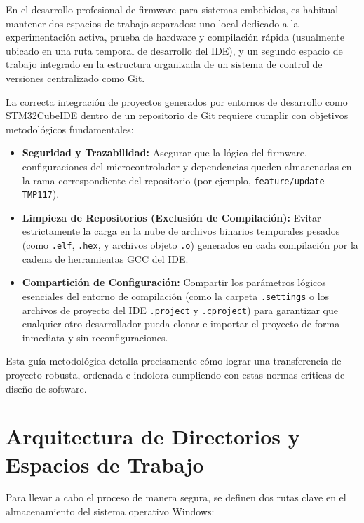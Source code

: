 \documentclass[
10pt, %
a4paper, %
oneside, %
headinclude,footinclude, %
BCOR5mm, %
]{scrartcl}
\begin{document}
En el desarrollo profesional de firmware para sistemas embebidos, es habitual mantener dos espacios de trabajo separados: uno local dedicado a la experimentación activa, prueba de hardware y compilación rápida (usualmente ubicado en una ruta temporal de desarrollo del IDE), y un segundo espacio de trabajo integrado en la estructura organizada de un sistema de control de versiones centralizado como Git.

La correcta integración de proyectos generados por entornos de desarrollo como STM32CubeIDE dentro de un repositorio de Git requiere cumplir con objetivos metodológicos fundamentales:

\begin{itemize}
	\item \textbf{Seguridad y Trazabilidad:} Asegurar que la lógica del firmware, configuraciones del microcontrolador y dependencias queden almacenadas en la rama correspondiente del repositorio (por ejemplo, \texttt{feature/update-TMP117}).
	\item \textbf{Limpieza de Repositorios (Exclusión de Compilación):} Evitar estrictamente la carga en la nube de archivos binarios temporales pesados (como \texttt{.elf}, \texttt{.hex}, y archivos objeto \texttt{.o}) generados en cada compilación por la cadena de herramientas GCC del IDE.
	\item \textbf{Compartición de Configuración:} Compartir los parámetros lógicos esenciales del entorno de compilación (como la carpeta \texttt{.settings} o los archivos de proyecto del IDE \texttt{.project} y \texttt{.cproject}) para garantizar que cualquier otro desarrollador pueda clonar e importar el proyecto de forma inmediata y sin reconfiguraciones.
\end{itemize}

Esta guía metodológica detalla precisamente cómo lograr una transferencia de proyecto robusta, ordenada e indolora cumpliendo con estas normas críticas de diseño de software.

\newpage
\section{Arquitectura de Directorios y Espacios de Trabajo}

Para llevar a cabo el proceso de manera segura, se definen dos rutas clave en el almacenamiento del sistema operativo Windows:
\end{document}
